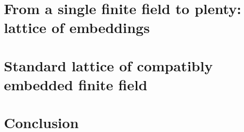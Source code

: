 \documentclass[a4paper,11pt]{report}
\begin{document}
\chapter{From a single finite field to plenty: lattice of embeddings}
\label{chap:lattice}


\chapter{Standard lattice of compatibly embedded finite field}
\label{chap:standard}


\chapter*{Conclusion}
\label{chap:conclusion}


\clearpage


\end{document}
